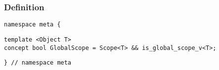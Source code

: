 
\subsubsection{Definition}

\begin{verbatim}
namespace meta {
\end{verbatim}
\begin{verbatim}
template <Object T>
concept bool GlobalScope = Scope<T> && is_global_scope_v<T>;

\end{verbatim}
\begin{verbatim}
} // namespace meta
\end{verbatim}

